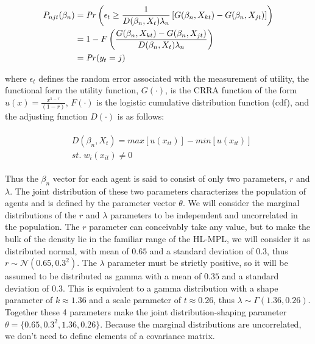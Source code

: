 \documentclass[../main.tex]{subfiles}
\begin{document}
\begin{align}
	\label{eq3:RE}
	\begin{split}
	P_{njt}(\beta_n) &= {\mathit{Pr}}\left(  \epsilon_t \geq \frac{1}{D(\beta_n,X_t) \lambda_n} \left[ G(\beta_n,X_{kt}) - G(\beta_n,X_{jt}) \right] \right)\\
	&= 1 - F\left( \dfrac{G(\beta_n,X_{kt}) - G(\beta_n,X_{jt})}{D(\beta_n,X_t)\lambda_n }  \right)\\
	&= {\mathit{Pr}}(y_t = j)
	\end{split}
\end{align}

\noindent where $\epsilon_t$ defines the random error associated with the measurement of utility, the functional form the utility function, $G(\cdot)$, is the CRRA function of the form $u(x) = \frac{x^{1-r}}{(1-r)}$, $F(\cdot)$ is the logistic cumulative distribution function (cdf), and the adjusting function $D(\cdot)$ is as follows:

\begin{align}
	\label{eq3:CU}
	\begin{split}
		&D(\beta_n,X_t) = \mathit{max}[u(x_{it})] - \mathit{min}[u(x_{it})]\\
		&\mathit{st.}\; w_i(x_{it}) \neq 0
	\end{split}
\end{align}

\noindent Thus the $\beta_n$ vector for each agent is said to consist of only two parameters, $r$ and $\lambda$.
The joint distribution of these two parameters characterizes the population of agents and is defined by the parameter vector $\theta$.
We will consider the marginal distributions of the $r$ and $\lambda$ parameters to be independent and uncorrelated in the population.{\footnotemark}
The $r$ parameter can conceivably take any value, but to make the bulk of the density lie in the familiar range of the HL-MPL, we will consider it as distributed normal, with mean of $0.65$ and a standard deviation of $0.3$, thus $r \sim \mathcal{N}(0.65 , 0.3^2 )$.
The $\lambda$ parameter must be strictly positive, so it will be assumed to be distributed as gamma with a mean of $0.35$ and a standard deviation of $0.3$.
This is equivalent to a gamma distribution with a shape parameter of $k \approx 1.36$ and a scale parameter of $t\approx0.26$, thus $\lambda \sim \Gamma(1.36 , 0.26)$.
Together these 4 parameters make the joint distribution-shaping parameter $\theta=\{0.65 ,0.3^2, 1.36 , 0.26\}$.
Because the marginal distributions are uncorrelated, we don't need to define elements of a covariance matrix.
\end{document}
